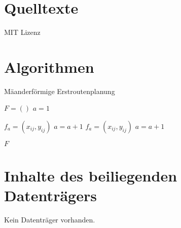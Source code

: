 \label{chap:anhang}


\section{Quelltexte}
\label{sec:quelltexte}


\begin{code}
  
  \caption{MIT Lizenz}
  \label{lst:mitlizenz}
\end{code}


\section{Algorithmen}


\begin{algorithm}
  \caption{Mäanderförmige Erstroutenplanung}
  \begin{algorithmic}[1]
    \State $F=()$
    \State $a=1$

          \State $f_a = (x_{ij}, y_{ij})$
          \State $a=a+1$
        \EndFor
      \Else
          \State $f_a = (x_{ij}, y_{ij})$
          \State $a=a+1$
        \EndFor
      \EndIf
    \EndFor

    \State \Return $F$

    \EndProcedure
  \end{algorithmic}
\end{algorithm}


\section{Inhalte des beiliegenden Datenträgers}
\label{sec:quelltexte}
Kein Datenträger vorhanden.
